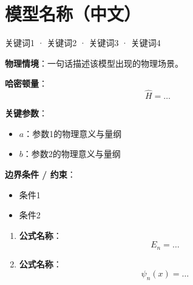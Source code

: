 %   

\section{模型名称（中文）}
\label{sec:model-name}

\begin{tipbox}[关键词标签]
关键词1 · 关键词2 · 关键词3 · 关键词4
\end{tipbox}

\begin{modelbox}[模型：XXX]
\textbf{物理情境}：一句话描述该模型出现的物理场景。

\textbf{哈密顿量}：
\[
\hat{H} = \dots
\]

\textbf{关键参数}：
\begin{itemize}[nosep]
    \item $a$：参数1的物理意义与量纲
    \item $b$：参数2的物理意义与量纲
\end{itemize}

\textbf{边界条件 / 约束}：
\begin{itemize}[nosep]
    \item 条件1
    \item 条件2
\end{itemize}
\end{modelbox}

\begin{formulabox}[核心公式]
\begin{enumerate}[label=\textbf{(\arabic*)}]
    \item \textbf{公式名称}：
    \[
    E_n = \dots
    \]

    \item \textbf{公式名称}：
    \[
    \psi_n(x) = \dots
    \]
\end{enumerate}
\end{formulabox}

